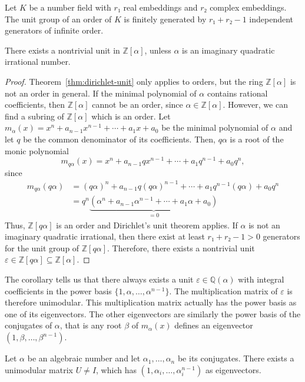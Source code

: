 \begin{theorem}
  \label{thm:dirichlet-unit}
  Let $K$ be a number field with $r₁$ real embeddings and $r₂$ complex embeddings.
  The unit group of an order of $K$ is finitely generated by $r₁ + r₂ - 1$
  independent generators of infinite order.
\end{theorem}

\begin{corollary}
  \label{cor:nontrivial-unit}
  There exists a nontrivial unit in $ℤ[α]$,
  unless $α$ is an imaginary quadratic irrational number.
\end{corollary}

\begin{proof}
  Theorem~\ref{thm:dirichlet-unit} only applies to orders,
  but the ring $ℤ[α]$ is not an order in general.
  If the minimal polynomial of $α$ contains rational coefficients,
  then $ℤ[α]$ cannot be an order, since $α ∈ ℤ[α]$.
  However, we can find a subring of $ℤ[α]$ which is an order.
  Let $m_α(x) = x^n + a_{n-1} x^{n-1} + ⋯ + a_1 x + a_0$ be the minimal polynomial of $α$
  and let $q$ be the common denominator of its coefficients.
  Then, $q α$ is a root of the monic polynomial
  \[
    m_{qα}(x) = x^n + a_{n-1} q x^{n-1} + ⋯ + a_1 q^{n-1} + a_0 q^n,
  \]
  since
  \begin{align*}
    m_{qα}(qα)
    & = (qα)^n + a_{n-1} q (qα)^{n-1} + ⋯ + a_1 q^{n-1} (q α) + a_0 q^n \\
    & = q^n \underbrace{(α^n + a_{n-1} α^{n-1} + ⋯ + a_1 α + a_0)}_{= 0}
  \end{align*}
  Thus, $ℤ[qα]$ is an order and Dirichlet's unit theorem applies.
  If $α$ is not an imaginary quadratic irrational, then there exist at least $r₁ + r₂ - 1 > 0$
  generators for the unit group of $ℤ[qα]$.
  Therefore, there exists a nontrivial unit $ε ∈ ℤ[qα] ⊆ ℤ[α]$.
\end{proof}

The corollary tells us that there always exists a unit $ε ∈ ℚ(α)$ with integral
coefficients in the power basis $\{1, α, …, α^{n-1}\}$.
The multiplication matrix of $ε$ is therefore unimodular.
This multiplication matrix actually has the power basis as one of its eigenvectors.
The other eigenvectors are similarly the power basis of the conjugates of $α$,
that is any root $β$ of $m_α(x)$ defines an eigenvector $(1, β, …, β^{n-1})$.

\begin{theorem}
  \label{thm:unimodular-algebraic}
  Let $α$ be an algebraic number and let $α_1, …, α_n$ be its conjugates.
  There exists a unimodular matrix $U ≠ I$,
  which has $(1, α_i, …, α_i^{n-1})$ as eigenvectors.
\end{theorem}


